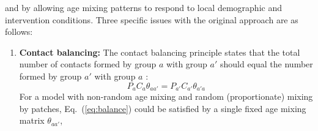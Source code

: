and by allowing age mixing patterns to respond to local demographic and intervention conditions.
Three specific issues with the original approach are as follows:
\begin{enumerate}
  \item \textbf{Contact balancing:}\label{issue:balance}
  The contact balancing principle states that
  the total number of contacts formed by group $a$ with group $a'$
  should equal the number formed by group $a'$ with group $a$ \cite{Arregui2018}:
  \begin{equation}\label{eq:balance}
    P_{a} C_{a} \theta_{aa'} = P_{a'} C_{a'} \theta_{a'a}
  \end{equation}
  For a model with non-random age mixing and random (proportionate) mixing by patches,
  Eq.~(\ref{eq:balance}) could be satisfied by a single fixed age mixing matrix $\theta_{aa'}$,

\end{enumerate}
